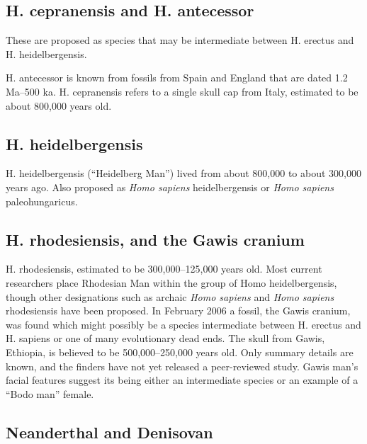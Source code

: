 \hypertarget{h.-cepranensis-and-h.-antecessor}{%
\subsection{H. cepranensis and H. antecessor}\label{h.-cepranensis-and-h.-antecessor}}

These are proposed as species that may be intermediate between H. erectus and H. heidelbergensis.

H. antecessor is known from fossils from Spain and England that are dated 1.2 Ma--500 ka.
H. cepranensis refers to a single skull cap from Italy, estimated to be about 800,000 years old.

\hypertarget{h.-heidelbergensis}{%
\subsection{H. heidelbergensis}\label{h.-heidelbergensis}}

H. heidelbergensis (``Heidelberg Man'') lived from about 800,000 to about 300,000 years ago. Also proposed as \emph{Homo sapiens} heidelbergensis or \emph{Homo sapiens} paleohungaricus.

\hypertarget{h.-rhodesiensis-and-the-gawis-cranium}{%
\subsection{H. rhodesiensis, and the Gawis cranium}\label{h.-rhodesiensis-and-the-gawis-cranium}}

H. rhodesiensis, estimated to be 300,000--125,000 years old. Most current researchers place Rhodesian Man within the group of Homo heidelbergensis, though other designations such as archaic \emph{Homo sapiens} and \emph{Homo sapiens} rhodesiensis have been proposed.
In February 2006 a fossil, the Gawis cranium, was found which might possibly be a species intermediate between H. erectus and H. sapiens or one of many evolutionary dead ends. The skull from Gawis, Ethiopia, is believed to be 500,000--250,000 years old. Only summary details are known, and the finders have not yet released a peer-reviewed study. Gawis man's facial features suggest its being either an intermediate species or an example of a ``Bodo man'' female.

\hypertarget{neanderthal-and-denisovan}{%
\subsection{Neanderthal and Denisovan}\label{neanderthal-and-denisovan}}

